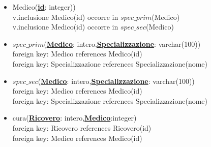 \documentclass[12pt, letterpaper]{article}
\begin{document}
\begin{itemize}
    \item Medico(\underline{\textbf{id}}: integer))\\
    v.inclusione Medico(id) occorre in $spec\_prim$(Medico)\\
    v.inclusione Medico(id) occorre in $spec\_sec$(Medico)
    \item $spec\_prim$(\underline{\textbf{Medico}}: intero,\underline{\textbf{Specializzazione}}: varchar(100))\\
    foreign key: Medico references Medico(id)\\
    foreign key: Specializzazione references Specializzazione(nome)\\
    \item $spec\_sec$(\underline{\textbf{Medico}}: intero,\underline{\textbf{Specializzazione}}: varchar(100))\\
    foreign key: Medico references Medico(id)\\
    foreign key: Specializzazione references Specializzazione(nome)\\
    \item cura(\underline{\textbf{Ricovero}}: intero,\underline{\textbf{Medico}}:integer)\\
    foreign key: Ricovero references Ricovero(id)\\
    foreign key: Medico references Medico(id)\\
    
\end{itemize}
\end{document}
